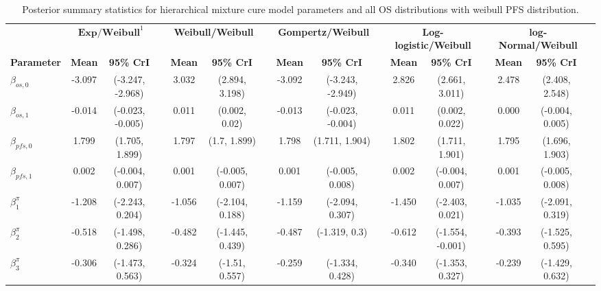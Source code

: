 \documentclass[AMA,STIX1COL]{WileyNJD-v2}
\begin{document}
\begin{landscape}
\begin{center}
\begin{table}[t]
\caption{Posterior summary statistics for hierarchical mixture cure model parameters and all OS distributions with weibull PFS distribution. \label{tab:post_hier_pfs_weibull}}
\centering
\begin{tabular}{l c c c c c c c c c c c c c c c}
\toprule
\multicolumn{1}{l}{} & \multicolumn{2}{c}{$\textbf{Exp/Weibull}^1$} & & \multicolumn{2}{c}{\textbf{Weibull/Weibull}} & & \multicolumn{2}{c}{\textbf{Gompertz/Weibull}} & & \multicolumn{2}{c}{\textbf{Log-logistic/Weibull}} & & \multicolumn{2}{c}{\textbf{log-Normal/Weibull}}\\
\cmidrule{2-3}\cmidrule{5-6}\cmidrule{8-9}\cmidrule{11-12}\cmidrule{14-15}
\textbf{Parameter} & \textbf{Mean} & \textbf{95\% CrI} & & \textbf{Mean} & \textbf{95\% CrI} & & \textbf{Mean} & \textbf{95\% CrI} & & \textbf{Mean} & \textbf{95\% CrI} & & \textbf{Mean} & \textbf{95\% CrI}\\
\midrule
$\beta_{os, 0}$ & -3.097 & (-3.247, -2.968) &  & 3.032 & (2.894, 3.198) &  & -3.092 & (-3.243, -2.949) &  & 2.826 & (2.661, 3.011) &  & 2.478 & (2.408, 2.548) & \\
$\beta_{os, 1}$ & -0.014 & (-0.023, -0.005) &  & 0.011 & (0.002, 0.02) &  & -0.013 & (-0.023, -0.004) &  & 0.011 & (0.002, 0.022) &  & 0.000 & (-0.004, 0.005) & \\
$\beta_{pfs, 0}$ & 1.799 & (1.705, 1.899) &  & 1.797 & (1.7, 1.899) &  & 1.798 & (1.711, 1.904) &  & 1.802 & (1.711, 1.901) &  & 1.795 & (1.696, 1.903) & \\
$\beta_{pfs, 1}$ & 0.002 & (-0.004, 0.007) &  & 0.001 & (-0.005, 0.007) &  & 0.001 & (-0.005, 0.008) &  & 0.002 & (-0.004, 0.007) &  & 0.001 & (-0.005, 0.008) & \\
$\beta^{\pi}_1$ & -1.208 & (-2.243, 0.204) &  & -1.056 & (-2.104, 0.188) &  & -1.159 & (-2.094, 0.307) &  & -1.450 & (-2.403, 0.021) &  & -1.035 & (-2.091, 0.319) & \\
$\beta^{\pi}_2$ & -0.518 & (-1.498, 0.286) &  & -0.482 & (-1.445, 0.439) &  & -0.487 & (-1.319, 0.3) &  & -0.612 & (-1.554, -0.001) &  & -0.393 & (-1.525, 0.595) & \\
$\beta^{\pi}_3$ & -0.306 & (-1.473, 0.563) &  & -0.324 & (-1.51, 0.557) &  & -0.259 & (-1.334, 0.428) &  & -0.340 & (-1.353, 0.327) &  & -0.239 & (-1.429, 0.632) & \\

\end{tabular}
\end{table}
\end{center}
\end{landscape}
\end{document}
